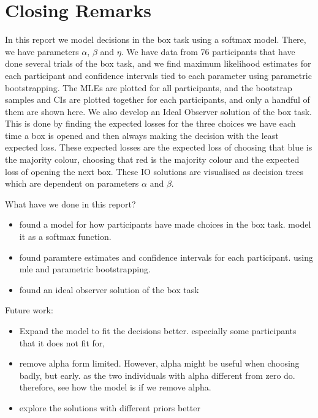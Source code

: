 \chapter{Closing Remarks}
In this report we model decisions in the box task using a softmax model. There, we have parameters $\alpha$, $\beta$ and $\eta$. We have data from 76 participants that have done several trials of the box task, and we find maximum likelihood estimates for each participant and confidence intervals tied to each parameter using parametric bootstrapping. The MLEs are plotted for all participants, and the bootstrap samples and CIs are plotted together for each participants, and only a handful of them are shown here. 
We also develop an Ideal Observer solution of the box task. This is done by finding the expected losses for the three choices we have each time a box is opened and then always making the decision with the least expected loss. These expected losses are the expected loss of choosing that blue is the majority colour, choosing that red is the majority colour and the expected loss of opening the next box. These IO solutions are visualised as decision trees which are dependent on parameters $\alpha$ and $\beta$.



What have we done in this report? 
\begin{itemize}
    \item found a model for how participants have made choices in the box task. model it as a softmax function. 
    \item found paramtere estimates and confidence intervals for each participant. using mle and parametric bootstrapping.
    \item found an ideal observer solution of the box task
\end{itemize}




Future work:
\begin{itemize}
    \item Expand the model to fit the decisions better. especially some participants that it does not fit for,
    \item remove alpha form limited. However, alpha might be useful when choosing badly, but early. as the two individuals with alpha different from zero do. therefore, see how the model is if we remove alpha. 
    \item explore the solutions with different priors better
\end{itemize}

